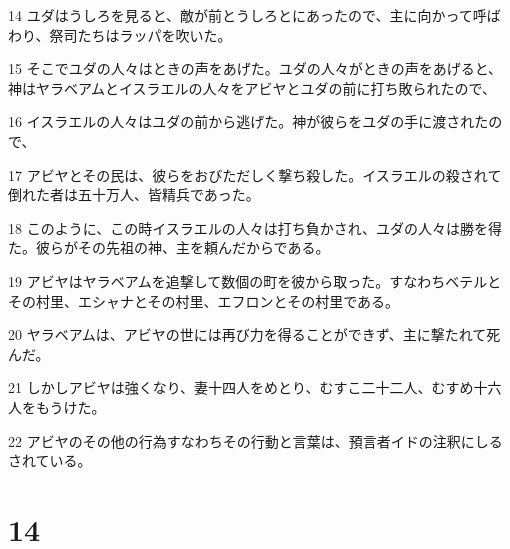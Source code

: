 \par 14 ユダはうしろを見ると、敵が前とうしろとにあったので、主に向かって呼ばわり、祭司たちはラッパを吹いた。
\par 15 そこでユダの人々はときの声をあげた。ユダの人々がときの声をあげると、神はヤラベアムとイスラエルの人々をアビヤとユダの前に打ち敗られたので、
\par 16 イスラエルの人々はユダの前から逃げた。神が彼らをユダの手に渡されたので、
\par 17 アビヤとその民は、彼らをおびただしく撃ち殺した。イスラエルの殺されて倒れた者は五十万人、皆精兵であった。
\par 18 このように、この時イスラエルの人々は打ち負かされ、ユダの人々は勝を得た。彼らがその先祖の神、主を頼んだからである。
\par 19 アビヤはヤラベアムを追撃して数個の町を彼から取った。すなわちベテルとその村里、エシャナとその村里、エフロンとその村里である。
\par 20 ヤラベアムは、アビヤの世には再び力を得ることができず、主に撃たれて死んだ。
\par 21 しかしアビヤは強くなり、妻十四人をめとり、むすこ二十二人、むすめ十六人をもうけた。
\par 22 アビヤのその他の行為すなわちその行動と言葉は、預言者イドの注釈にしるされている。

\chapter{14}

